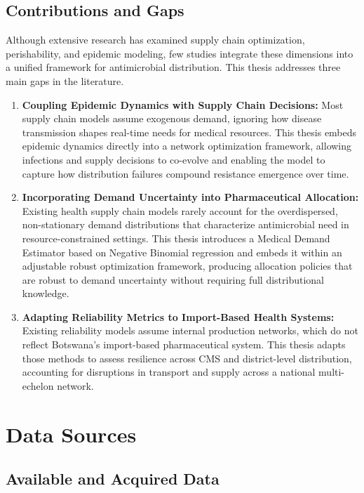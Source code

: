 \documentclass{article}
\begin{document}
\subsection{Contributions and Gaps}

Although extensive research has examined supply chain optimization, perishability, and epidemic modeling, few studies integrate these dimensions into a unified framework for antimicrobial distribution. This thesis addresses three main gaps in the literature.

\begin{enumerate}

\item \textbf{Coupling Epidemic Dynamics with Supply Chain Decisions:} Most supply chain models assume exogenous demand, ignoring how disease transmission shapes real-time needs for medical resources. This thesis embeds epidemic dynamics directly into a network optimization framework, allowing infections and supply decisions to co-evolve and enabling the model to capture how distribution failures compound resistance emergence over time.

\item \textbf{Incorporating Demand Uncertainty into Pharmaceutical Allocation:} Existing health supply chain models rarely account for the overdispersed, non-stationary demand distributions that characterize antimicrobial need in resource-constrained settings. This thesis introduces a Medical Demand Estimator based on Negative Binomial regression and embeds it within an adjustable robust optimization framework, producing allocation policies that are robust to demand uncertainty without requiring full distributional knowledge.

\item \textbf{Adapting Reliability Metrics to Import-Based Health Systems:} Existing reliability models assume internal production networks, which do not reflect Botswana's import-based pharmaceutical system. This thesis adapts those methods to assess resilience across CMS and district-level distribution, accounting for disruptions in transport and supply across a national multi-echelon network.

\end{enumerate}

\section{Data Sources}

\subsection{Available and Acquired Data}
\end{document}
